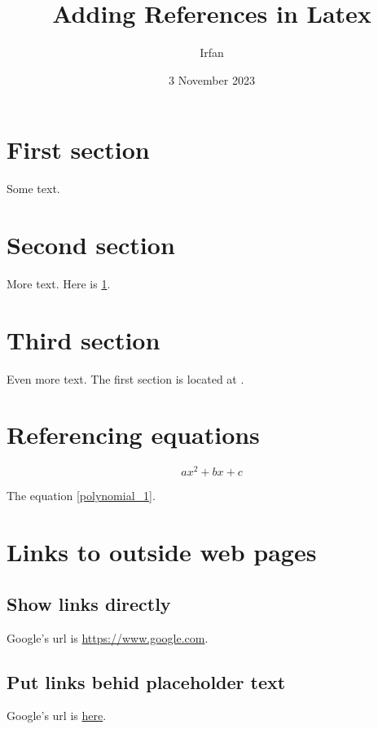 \documentclass{article}
\title{Adding References in Latex}
\author{Irfan}
\date{3 November 2023}
\begin{document}
\maketitle

\section{First section}
\label{first}
Some text.

\section{Second section}
More text. Here is \ref{first}.


\section{Third section}
Even more text. The first section is located
at \pageref{first}.

\section{Referencing equations}
\begin{equation}\label{polynomial_1}
  ax^2 + bx + c
\end{equation}

The equation \eqref{polynomial_1}.

\section{Links to outside web pages}
\subsection{Show links directly}
  Google's url is \url{https://www.google.com}.

\subsection{Put links behid placeholder text}
  Google's url is \href{https://www.google.com}{here}.
\end{document}
